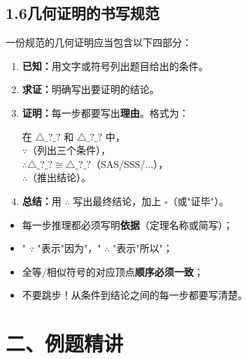\documentclass[12pt, a4paper]{ctexart}
\begin{document}
\subsection*{1.6\quad 几何证明的书写规范}

\begin{knowledgebox}[证明书写四步法]
一份规范的几何证明应当包含以下四部分：

\begin{enumerate}[leftmargin=2em]
  \item \textbf{已知：}用文字或符号列出题目给出的条件。
  \item \textbf{求证：}明确写出要证明的结论。
  \item \textbf{证明：}每一步都要写出\textbf{理由}。格式为：
  \begin{center}
    在 $\triangle \_?\_?$ 和 $\triangle \_?\_?$ 中，\\
    $\because$（列出三个条件），\\
    $\therefore \triangle \_?\_? \cong \triangle \_?\_?$（SAS/SSS/...），\\
    $\therefore$（推出结论）。
  \end{center}
  \item \textbf{总结：}用 $\therefore$ 写出最终结论，加上 $\square$（或"证毕"）。
\end{enumerate}

\begin{warnbox}[书写要点]
\begin{itemize}[nosep]
  \item 每一步推理都必须写明\textbf{依据}（定理名称或简写）；
  \item " $\because$ "表示"因为"，" $\therefore$ "表示"所以"；
  \item 全等/相似符号的对应顶点\textbf{顺序必须一致}；
  \item 不要跳步！从条件到结论之间的每一步都要写清楚。
\end{itemize}
\end{warnbox}
\end{knowledgebox}

\newpage

\section*{\textcolor{examorange}{二、例题精讲}}
\end{document}
